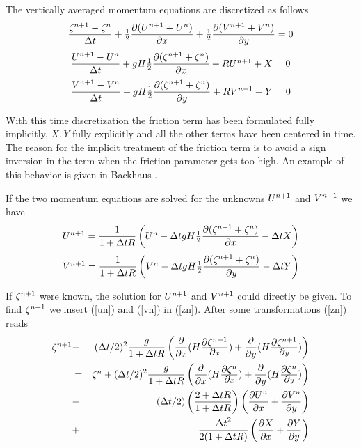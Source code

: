 The vertically averaged momentum equations are discretized as follows
\begin{equation}
\label{zn}
\frac{\zn-\zo}{\dt}
                        + \mez \frac{\dpp (\un + \uo)}{\dpp x}
                        + \mez \frac{\dpp (\vn + \vo)}{\dpp y} = 0
\end{equation}
\begin{equation}
\frac{\un-\uo}{\dt} + gH \dzxp + R \un + X = 0
\end{equation}
\begin{equation}
\frac{\vn-\vo}{\dt} + gH \dzyp + R \vn + Y = 0
\end{equation}

With this time discretization the friction term has been formulated
fully implicitly, $X,Y$ fully explicitly and all the other terms
have been centered in time. The reason for the implicit treatment
of the friction term is to avoid a sign inversion in the term when
the friction parameter gets too high. An example of this behavior is
given in Backhaus \cite{Backhaus83}.

If the two momentum equations are solved for the unknowns $\un$ and $\vn$
we have
\begin{equation}
\label{un}
\un = \frac{1}{1+\dt R} \paren{ \uo - \dt gH \dzxp - \dt X }
\end{equation}
\begin{equation}
\label{vn}
\vn = \frac{1}{1+\dt R} \paren{ \vo - \dt gH \dzyp - \dt Y }
\end{equation}

If $\zn$ were known, the solution for
$\un$ and $\vn$ could directly be given. To find $\zn$ we insert
(\ref{un}) and (\ref{vn}) in (\ref{zn}). After some transformations
(\ref{zn}) reads
\begin{eqnarray} \label{zsys}
        \zn
    & - &
        (\dt/2)^{2} \frac{g}{1+\dt R}         \nonumber
	\paren{ \frac{\dpp}{\dpp x}(H \dzxn) + \frac{\dpp}{\dpp y}(H \dzyn) } \\
    & = &
        \zo + (\dt/2)^{2} \frac{g}{1+\dt R}
	\paren{ \frac{\dpp}{\dpp x}(H \dzxo) + \frac{\dpp}{\dpp y}(H \dzyo) } \\
    & - & (\dt/2) \paren{ \frac{2+\dt R}{1+\dt R} }
        \paren{                               \nonumber
          \frac{\dpp \uo}{\dpp x}
        + \frac{\dpp \vo}{\dpp y}
        } \\
    & + & \frac{\dt^{2}}{2(1+\dt R)}            \nonumber
                \paren{ \frac{\dpp X}{\dpp x} + \frac{\dpp Y}{\dpp y} }
\end{eqnarray}

